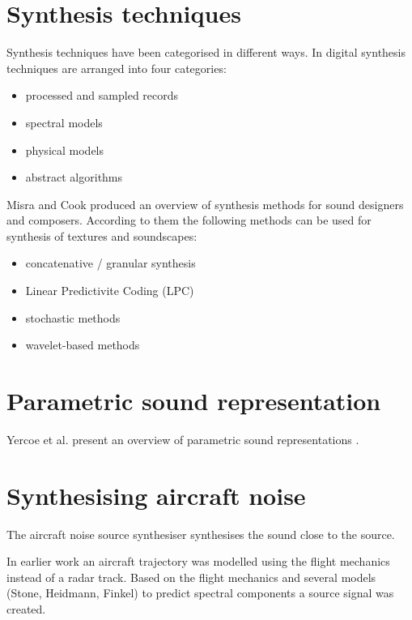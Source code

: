 \section{Synthesis techniques}
Synthesis techniques have been categorised in different ways. In \cite{JuliusO.Smith} digital synthesis techniques are arranged into four categories:
\begin{itemize}
 \item processed and sampled records
 \item spectral models
 \item physical models
 \item abstract algorithms
\end{itemize}

Misra and Cook produced an overview of synthesis methods for sound designers and 
composers.
According to them the following methods can be used for synthesis of textures 
and soundscapes:
\begin{itemize}
 \item concatenative / granular synthesis
 \item Linear Predictivite Coding (LPC)
 \item stochastic methods
 \item wavelet-based methods
\end{itemize}


\section{Parametric sound representation}
Yercoe et al. present an overview of parametric sound representations \cite{Vercoe1998}.


\section{Synthesising aircraft noise}
The aircraft noise source synthesiser synthesises the sound close to the source.



In earlier work \cite{Arntzen2011} an aircraft trajectory was modelled using 
the flight mechanics instead of a radar track. Based on the flight mechanics 
and several models (Stone, Heidmann, Finkel) to predict spectral components a 
source signal was created.



